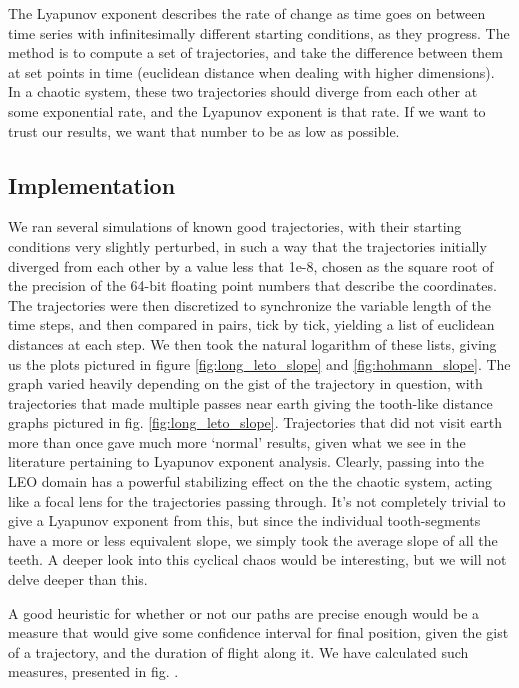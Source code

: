 The Lyapunov exponent describes the rate of change as time goes on between time series with infinitesimally different starting conditions, as they progress. The method is to compute a set of trajectories, and take the difference between them at set points in time (euclidean distance when dealing with higher dimensions). In a chaotic system, these two trajectories should diverge from each other at some exponential rate, and the Lyapunov exponent is that rate. If we want to trust our results, we want that number to be as low as possible. 

\subsection{Implementation}

We ran several simulations of known good trajectories, with their starting conditions very slightly perturbed, in such a way that the trajectories initially diverged from each other by a value less that 1e-8, chosen as the square root of the precision of the 64-bit floating point numbers that describe the coordinates. The trajectories were then discretized to synchronize the variable length of the time steps, and then compared in pairs, tick by tick, yielding a list of euclidean distances at each step. We then took the natural logarithm of these lists, giving us the plots pictured in figure \ref{fig:long_leto_slope} and \ref{fig:hohmann_slope}. The graph varied heavily depending on the gist of the trajectory in question, with trajectories that made multiple passes near earth giving the tooth-like distance graphs pictured in fig. \ref{fig:long_leto_slope}. Trajectories that did not visit earth more than once gave much more `normal' results, given what we see in the literature pertaining to Lyapunov exponent analysis. Clearly, passing into the LEO domain has a powerful stabilizing effect on the the chaotic system, acting like a focal lens for the trajectories passing through. It's not completely trivial to give a Lyapunov exponent from this, but since the individual tooth-segments have a more or less equivalent slope, we simply took the average slope of all the teeth. A deeper look into this cyclical chaos would be interesting, but we will not delve deeper than this.

A good heuristic for whether or not our paths are precise enough would be a measure that would give some confidence interval for final position, given the gist of a trajectory, and the duration of flight along it. We have calculated such measures, presented in fig. .

